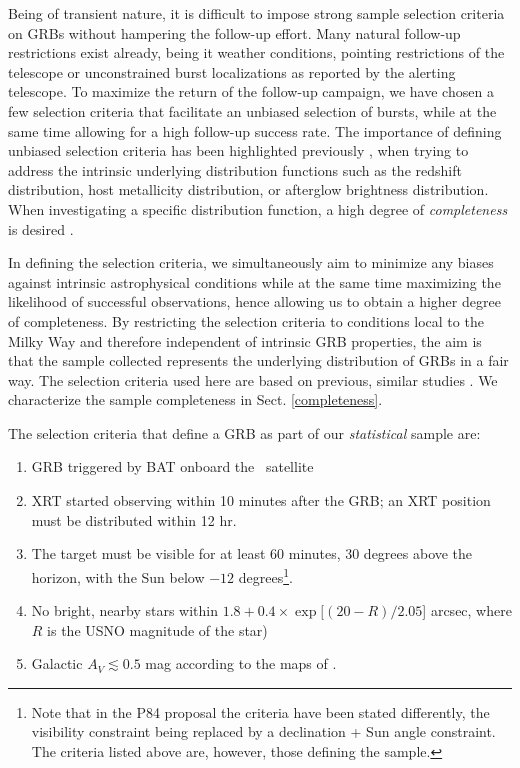 \documentclass{aa}    %
\begin{document}
Being of transient nature, it is difficult to impose strong sample selection
criteria on GRBs without hampering the follow-up effort. Many natural follow-up
restrictions exist already, being it weather conditions, pointing restrictions
of the telescope or unconstrained burst localizations as reported by the alerting
telescope. To maximize the return of the follow-up campaign, we have chosen a
few selection criteria that facilitate an unbiased selection of bursts, while
at the same time allowing for a high follow-up success rate. The importance of
defining unbiased selection criteria has been highlighted previously
\citep{Jakobsson2006b, Salvaterra2012, Hjorth2012, Vergani2015, Perley2016a},
when trying to address the intrinsic underlying distribution functions such as
the redshift distribution, host metallicity distribution, or afterglow
brightness distribution. When investigating a specific distribution function, a
high degree of \textit{completeness} is desired \citep[e.g.,][]{Perley2016b}.

In defining the selection criteria, we simultaneously aim to minimize any biases
against intrinsic astrophysical conditions while at the same time maximizing the
likelihood of successful observations, hence allowing us to obtain a higher
degree of completeness. By restricting the selection criteria to conditions
local to the Milky Way and therefore independent of intrinsic GRB properties,
the aim is that the sample collected represents the underlying distribution of
GRBs in a fair way. The selection criteria used here are based on previous,
similar studies \citep{Jakobsson2006b, Fynbo2009, Hjorth2012}. We characterize
the sample completeness in Sect. \ref{completeness}.

The selection criteria that define a GRB as part of our \textit{statistical}
	sample are:

\begin{enumerate}
	
	\item GRB triggered by BAT onboard the \swift~satellite

	\item XRT started observing within 10 minutes after the GRB; an XRT position
	must be distributed within 12 hr.
	
	\item The target must be visible for at least 60 minutes, 30 degrees above the
	horizon, with the Sun below $-12$ degrees\footnote{Note that in the P84
		proposal the criteria have been stated differently, the visibility constraint
		being replaced by a declination + Sun angle constraint. The criteria listed
		above are, however, those defining the sample.}.
	
	\item No bright, nearby stars within $ 1.8 + 0.4 \times \exp[(20 - R)/2.05$]
	arcsec, where $R$ is the USNO magnitude of the star)
	
	\item Galactic $A_V \lesssim 0.5$ mag according to the maps of \citet{Schlegel1998}.
	
\end{enumerate}
\end{document}
